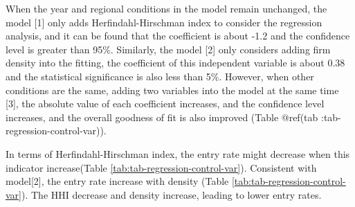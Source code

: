 \documentclass[
  12pt,
  oneside]{book}
\begin{document}
When the year and regional conditions in the model remain unchanged, the model {[}1{]} only adds Herfindahl-Hirschman index to consider the regression analysis, and it can be found that the coefficient is about -1.2 and the confidence level is greater than 95\%. Similarly, the model {[}2{]} only considers adding firm density into the fitting, the coefficient of this independent variable is about 0.38 and the statistical significance is also less than 5\%. However, when other conditions are the same, adding two variables into the model at the same time {[}3{]}, the absolute value of each coefficient increases, and the confidence level increases, and the overall goodness of fit is also improved (Table @ref(tab :tab-regression-control-var)).

In terms of Herfindahl-Hirschman index, the entry rate might decrease when this indicator increase(Table \ref{tab:tab-regression-control-var}).
Consistent with model{[}2{]}, the entry rate increase with density (Table \ref{tab:tab-regression-control-var}). The HHI decrease and density increase, leading to lower entry rates.
\end{document}
